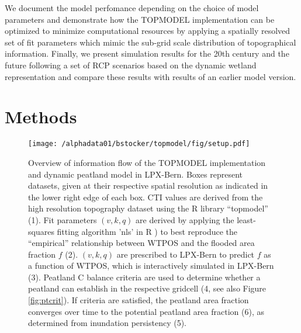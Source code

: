 We document the model perfomance depending on the choice of model parameters and demonstrate how the TOPMODEL implementation can be optimized to minimize computational resources by applying a spatially resolved set of fit parameters which mimic the sub-grid scale distribution of topographical information. Finally, we present simulation results for the 20th century and the future following a set of RCP scenarios based on the dynamic wetland representation and compare these results with results of an earlier model version.





\section{Methods}
\label{sec:topm.methods}

\begin{figure}[ht!]
  \texttt{[image: /alphadata01/bstocker/topmodel/fig/setup.pdf]}
  \caption[Overview of information flow of the TOPMODEL implementation and dynamic peatland model in LPX-Bern]{Overview of information flow of the TOPMODEL implementation and dynamic peatland model in LPX-Bern. Boxes represent datasets, given at their respective spatial resolution as indicated in the lower right edge of each box. CTI values are derived from the \citet{hydro1k} high resolution topography dataset using the R library ``topmodel'' \citep{rtopmodel} (1). Fit parameters $(v, k, q)$ are derived by applying the least-squares fitting algorithm 'nls' in R \citep{R}) to best reproduce the ``empirical'' relationship between WTPOS and the flooded area fraction $f$ (2). $(v, k, q)$ are prescribed to LPX-Bern to predict $f$ as a function of WTPOS, which is interactively simulated in LPX-Bern (3). Peatland C balance criteria are used to determine whether a peatland can establish in the respective gridcell (4, see also Figure \ref{fig:ptcrit}). If criteria are satisfied, the peatland area fraction converges over time to the potential peatland area fraction (6), as determined from inundation persistency (5).}
\label{fig:overview}
\end{figure}

